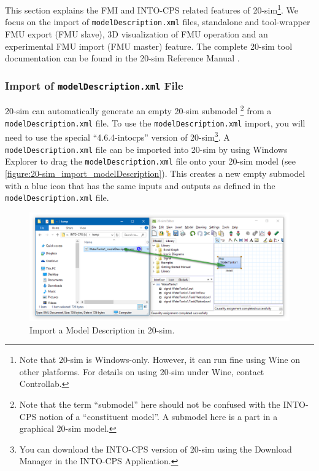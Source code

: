 This section explains the FMI and INTO-CPS related features of {20-sim}\footnote{Note that 20-sim is Windows-only. However, it can run fine using Wine \cite{winehq2016} on other platforms. For details on using 20-sim under Wine, contact Controllab.}.
%
We focus on the import of \texttt{model\allowbreak{}Description.\allowbreak{}xml} files, standalone and tool-wrapper FMU export (FMU slave), 3D visualization of FMU operation and an experimental FMU import (FMU master) feature.
%
The complete {20-sim} tool documentation can be found in the {20-sim} Reference Manual \cite{20simReference16a}.

\subsubsection{Import of \texttt{modelDescription.xml} File}\label{sec:simulators:20sim:modeldescriptionimport}
{20-sim} can automatically generate an empty {20-sim} submodel
\footnote{Note that the term ``submodel'' here should not be confused with the INTO-CPS notion of a ``constituent model''.  A submodel here is a part in a graphical 20-sim model.}
from a \texttt{mo\-del\-Description\-.xml} file.
To use the \texttt{modelDescription\allowbreak{}.xml} import, you will need to use the special ``4.6.4-intocps'' version of 20-sim\footnote{You can download the INTO-CPS version of 20-sim using the Download Manager in the INTO-CPS Application.}.
%
A \texttt{mo\-del\-Description\allowbreak{}.xml} file can be imported into {20-sim} by using Windows Explorer to drag the \texttt{model\-Description\allowbreak{}.xml} file onto your {20-sim} model (see \autoref{figure:20-sim_import_modelDescription}).
%
%
%
This creates a new empty submodel with a blue icon that has the same inputs and outputs as defined in the \texttt{modelDescription\allowbreak{}.xml} file.
%
%
%
\begin{figure}[hpt]
	\centerline{\includegraphics[width=\textwidth]{figures/20-sim_import_modelDescription.png}}
	\caption{Import a Model Description in 20-sim.}
	\label{figure:20-sim_import_modelDescription}
\end{figure}
%
%
%
